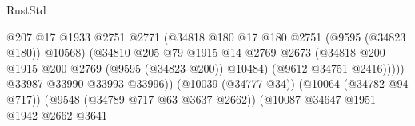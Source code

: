 \begin{lexlean}{RustStd}
\begin{coremodule}
                                                          @207
                                                          @17
                                                          @1933
                                                          @2751
                                                          @2771
                                                          (@34818
                                                            @180
                                                            @17
                                                            @180
                                                            @2751
                                                            (@9595 (@34823 @180))
                                                            @10568)
                                                          (@34810
                                                            @205
                                                            @79
                                                            @1915
                                                            @14
                                                            @2769
                                                            @2673
                                                            (@34818
                                                              @200
                                                              @1915
                                                              @200
                                                              @2769
                                                              (@9595 (@34823 @200))
                                                              @10484)
                                                            (@9612 @34751 @2416)))))
                                                    @33987
                                                    @33990
                                                    @33993
                                                    @33996))
                                                (@10039 (@34777 @34))
                                                (@10064 (@34782 @94 @717))
                                                (@9548 (@34789 @717 @63 @3637 @2662))
                                                (@10087
                                                  @34647
                                                  @1951
                                                  @1942
                                                  @2662
                                                  @3641

\end{coremodule}
\end{lexlean}
